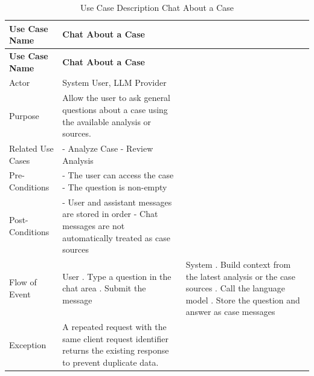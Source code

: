 \begin{longtable}{@{}>{\raggedright\arraybackslash}p{} >{\raggedright\arraybackslash}p{} >{\raggedright\arraybackslash}p{}@{}}
\caption{Use Case Description Chat About a Case}\label{tab:3-6}\\
\toprule
\textbf{Use Case Name} & \textbf{Chat About a Case} & \textbf{} \\
\midrule
\endfirsthead
\textbf{Use Case Name} & \textbf{Chat About a Case} & \textbf{} \\
\midrule
\endhead
Actor & System User, LLM Provider &  \\
Purpose & Allow the user to ask general questions about a case using the available analysis or sources. &  \\
Related Use Cases & - Analyze Case \newline - Review Analysis &  \\
Pre-Conditions & - The user can access the case \newline - The question is non-empty &  \\
Post-Conditions & - User and assistant messages are stored in order \newline - Chat messages are not automatically treated as case sources &  \\
Flow of Event & User \newline 1. Type a question in the chat area \newline 2. Submit the message & System \newline 1. Build context from the latest analysis or the case sources \newline 2. Call the language model \newline 3. Store the question and answer as case messages \\
Exception & A repeated request with the same client request identifier returns the existing response to prevent duplicate data. &  \\
\bottomrule
\end{longtable}

